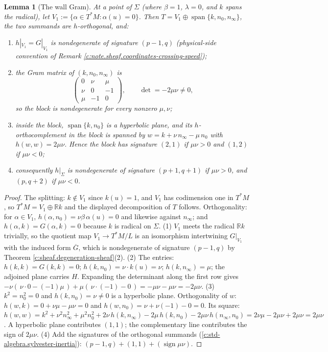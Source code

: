 \documentclass[11pt]{article}
\newtheorem{lemma}[theorem]{Lemma}
\theoremstyle{definition}
\theoremstyle{plain}
\providecommand{\R}{}\renewcommand{\R}{\mathbb{R}}
\providecommand{\Sig}{}\renewcommand{\Sig}{\Sigma}
\providecommand{\nInf}{}\renewcommand{\nInf}{n_\infty}
\providecommand{\nO}{}\renewcommand{\nO}{n_0}
\providecommand{\shL}{}\renewcommand{\shL}{L}
\begin{document}
\begin{lemma}[The wall Gram]\label{c:sheaf.wall-gram}
At a point of $\Sig$ (where $\beta = 1$, $\lambda = 0$, and $k$ spans the radical), let $V_1 := \{\alpha \in T^*M : \alpha(u) = 0\}$. Then $T = V_1 \oplus \operatorname{span}\{k, \nO, \nInf\}$, the two summands are $h$-orthogonal, and:
\begin{enumerate}
\item $h|_{V_1} = G|_{V_1}$ is nondegenerate of signature $(p{-}1, q)$ (physical-side convention of Remark \ref{c:note.sheaf.coordinates-crossing-speed});
\item the Gram matrix of $(k, \nO, \nInf)$ is
\[
\begin{pmatrix} 0 & \nu & \mu \\ \nu & 0 & -1 \\ \mu & -1 & 0 \end{pmatrix},
\qquad \det = -2\mu\nu \neq 0 ,
\]
so the block is nondegenerate for every nonzero $\mu, \nu$;
\item inside the block, $\operatorname{span}\{k, \nO\}$ is a hyperbolic plane, and its $h$-orthocomplement in the block is spanned by $w = k + \nu\,\nInf - \mu\,\nO$ with $h(w,w) = 2\mu\nu$. Hence the block has signature $(2,1)$ if $\mu\nu > 0$ and $(1,2)$ if $\mu\nu < 0$;
\item consequently $h|_\Sig$ is nondegenerate of signature $(p{+}1, q{+}1)$ if $\mu\nu > 0$, and $(p, q{+}2)$ if $\mu\nu < 0$.
\end{enumerate}
\end{lemma}
\begin{proof}
The splitting: $k \notin V_1$ since $k(u) = 1$, and $V_1$ has codimension one in $T^*M$, so $T^*M = V_1 \oplus \R k$ and the displayed decomposition of $T$ follows. Orthogonality: for $\alpha \in V_1$, $h(\alpha, \nO) = \nu\beta\,\alpha(u) = 0$ and likewise against $\nInf$; and $h(\alpha, k) = G(\alpha, k) = 0$ because $k$ is radical on $\Sig$. (1) $V_1$ meets the radical $\R k$ trivially, so the quotient map $V_1 \to T^*M/\shL$ is an isomorphism intertwining $G|_{V_1}$ with the induced form $\overline{G}$, which is nondegenerate of signature $(p{-}1,q)$ by Theorem \ref{c:sheaf.degeneration-sheaf}(2). (2) The entries: $h(k,k) = G(k,k) = 0$; $h(k, \nO) = \nu \cdot k(u) = \nu$; $h(k, \nInf) = \mu$; the adjoined plane carries $H$. Expanding the determinant along the first row gives $-\nu(\,\nu \cdot 0 - (-1)\mu\,) + \mu(\,\nu \cdot (-1) - 0\,) = -\mu\nu - \mu\nu = -2\mu\nu$. (3) $k^2 = \nO^2 = 0$ and $h(k, \nO) = \nu \neq 0$ is a hyperbolic plane. Orthogonality of $w$: $h(w, k) = 0 + \nu\mu - \mu\nu = 0$ and $h(w, \nO) = \nu + \nu(-1) - 0 = 0$. Its square: $h(w,w) = k^2 + \nu^2 \nInf^2 + \mu^2 \nO^2 + 2\nu\,h(k,\nInf) - 2\mu\,h(k,\nO) - 2\mu\nu\,h(\nInf,\nO) = 2\nu\mu - 2\mu\nu + 2\mu\nu = 2\mu\nu$. A hyperbolic plane contributes $(1,1)$; the complementary line contributes the sign of $2\mu\nu$. (4) Add the signatures of the orthogonal summands (\ref{c:std-algebra.sylvester-inertia}): $(p{-}1, q) + (1,1) + (\operatorname{sign} \mu\nu)$.

\end{proof}
\end{document}
